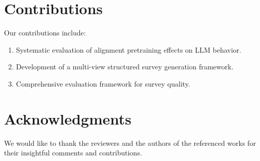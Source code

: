 \documentclass{article}
\begin{document}
\section{Contributions}
\label{sec:contributions}

Our contributions include:
\begin{enumerate}
    \item Systematic evaluation of alignment pretraining effects on LLM behavior.
    \item Development of a multi-view structured survey generation framework.
    \item Comprehensive evaluation framework for survey quality.
\end{enumerate}

\section*{Acknowledgments}
We would like to thank the reviewers and the authors of the referenced works for their insightful comments and contributions.



\end{document}
